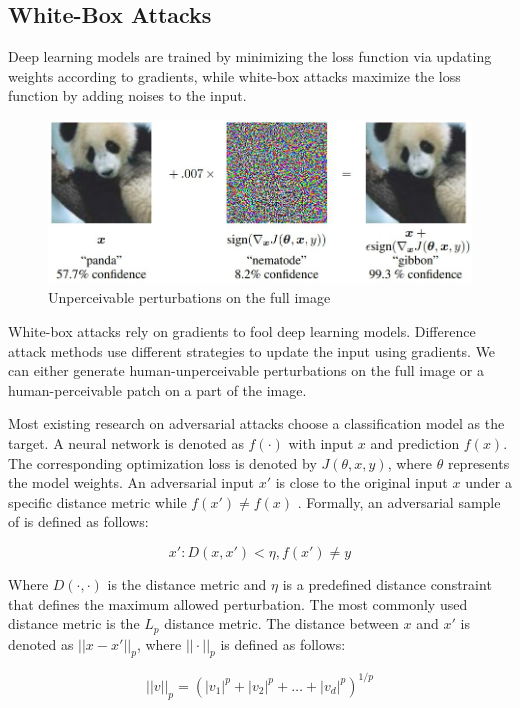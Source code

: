 \subsection{White-Box Attacks}
\label{sec:whitebox_attack}

Deep learning models are trained by minimizing the loss function via updating weights according to gradients, while white-box attacks maximize the loss function by adding noises to the input.

\begin{figure}[H]
\centering
\includegraphics[scale=0.5]{figures/chapter_intro/fgsm.jpg}
\caption{Unperceivable perturbations on the full image}
\label{fig.adv_perturb}
\end{figure}

White-box attacks rely on gradients to fool deep learning models. Difference attack methods use different strategies to update the input using gradients. We can either generate human-unperceivable perturbations on the full image or a human-perceivable patch on a part of the image.

Most existing research on adversarial attacks choose a classification model as the target. A neural network is denoted as $f(\cdot)$ with input $x$ and prediction $f(x)$. The corresponding optimization loss is denoted by $J(\theta, x, y)$, where $\theta$ represents the model weights. An adversarial input $x'$ is close to the original input $x$ under a specific distance metric while $f(x') \neq f(x)$ \cite{REN2020346}. Formally, an adversarial sample of  is defined as follows:

$$x': D(x, x') < \eta, f(x') \neq y $$

Where $D(\cdot, \cdot)$ is the distance metric and $ \eta $ is a predefined distance constraint that defines the maximum allowed perturbation. The most commonly used distance metric is the $L_p$ distance metric. The distance between $x$ and $x'$ is denoted as $||x-x'||_{p}$, where $||\cdot||_p$ is defined as follows:

$$ ||v||_p = (|v_1|^p + |v_2|^p + \dots + |v_d|^p)^{1/p} $$

